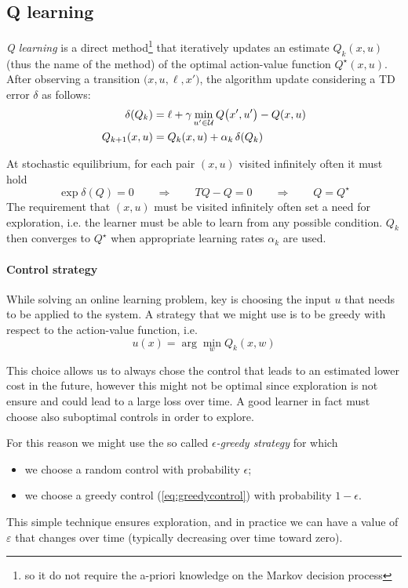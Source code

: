 \subsection{Q learning}
	\textit{Q learning} is a direct method\footnote{so it do not require the a-priori knowledge on the Markov decision process} that iteratively updates an estimate $Q_k(x,u)$ (thus the name of the method) of the optimal action-value function $Q^\star(x,u)$. After observing a transition $\big(x,u,\ell, x'\big)$, the algorithm update considering a TD error $\delta$ as follows:
	\begin{equation} \label{eq:Qlearning}
	\begin{aligned} 
		\delta(Q_k) & = \ell + \gamma \min_{u'\in \mathcal U} Q\big(x',u'\big) - Q(x,u) \\
		Q_{k+1}(x,u) & = Q_k(x,u) + \alpha_k\, \delta(Q_k)
	\end{aligned}
	\end{equation}
	
	At stochastic equilibrium, for each pair $(x,u)$ visited infinitely often it must hold
	\[ \exp{\delta(Q)} = 0 \qquad \Rightarrow \qquad TQ - Q = 0 \qquad \Rightarrow \qquad Q=Q^\star \]
	The requirement that $(x,u)$ must be visited infinitely often set a need for exploration, i.e. the learner must be able to learn from any possible condition. $Q_k$ then converges to $Q^\star$ when appropriate learning rates $\alpha_k$ are used.
	
	\paragraph{Control strategy} While solving an online learning problem, key is choosing the input $u$ that needs to be applied to the system. A strategy that we might use is to be greedy with respect to the action-value function, i.e.
	\begin{equation} \label{eq:greedycontrol}
		u(x) = \arg\min_w Q_k(x,w)
	\end{equation}
	
	This choice allows us to always chose the control that leads to an estimated lower cost in the future, however this might not be optimal since exploration is not ensure and could lead to a large loss over time. A good learner in fact must choose also suboptimal controls in order to explore. 
	
	For this reason we might use the so called \textit{$\epsilon$-greedy strategy} for which 
	\begin{itemize}
		\item we choose a random control with probability $\epsilon$;
		\item we choose a greedy control (\ref{eq:greedycontrol}) with probability $1-\epsilon$.
	\end{itemize}
	This simple technique ensures exploration, and in practice we can have a value of $\varepsilon$ that changes over time (typically decreasing over time toward zero).
	
